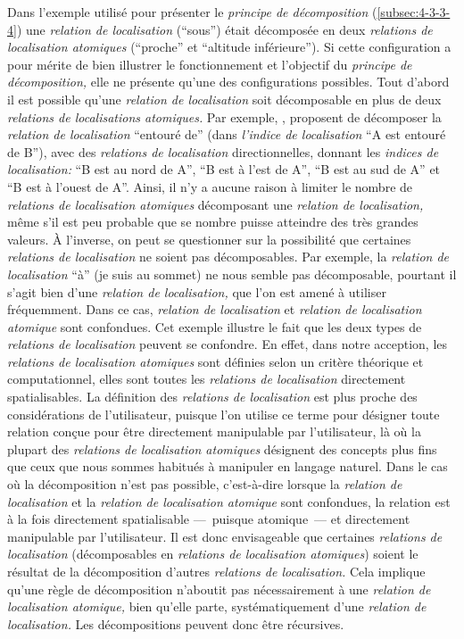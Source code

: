 Dans l'exemple utilisé pour présenter le \emph{principe de
  décomposition} (\autoref{subsec:4-3-3-4}) une \emph{relation de
  localisation} (\enquote{sous}) était décomposée en deux
\emph{relations de localisation atomiques} (\enquote{proche} et
\enquote{altitude inférieure}). Si cette configuration a pour mérite
de bien illustrer le fonctionnement et l'objectif du \emph{principe de
  décomposition,} elle ne présente qu'une des configurations
possibles. Tout d'abord il est possible qu'une \emph{relation de
  localisation} soit décomposable en plus de deux \emph{relations de
  localisations atomiques.} Par exemple, \textcite{Vanegas2011},
proposent de décomposer la \emph{relation de localisation}
\enquote{entouré de} (dans \emph{l'indice de localisation} \enquote{A
  est entouré de B}), avec des \emph{relations de localisation}
directionnelles, donnant les \emph{indices de localisation:}
\enquote{B est au nord de A}, \enquote{B est à l'est de A}, \enquote{B
  est au sud de A} et \enquote{B est à l'ouest de A}. Ainsi, il n'y a
aucune raison à limiter le nombre de \emph{relations de localisation
  atomiques} décomposant une \emph{relation de localisation,} même
s'il est peu probable que se nombre puisse atteindre des très grandes
valeurs. À l'inverse, on peut se questionner sur la possibilité que
certaines \emph{relations de localisation} ne soient pas
décomposables. Par exemple, la \emph{relation de localisation}
\enquote{à} (\eg je suis au sommet) ne nous semble pas décomposable,
pourtant il s'agit bien d'une \emph{relation de localisation,} que
l'on est amené à utiliser fréquemment. Dans ce cas, \emph{relation de
  localisation} et \emph{relation de localisation atomique} sont
confondues. Cet exemple illustre le fait que les deux types de
\emph{relations de localisation} peuvent se confondre. En effet, dans
notre acception, les \emph{relations de localisation atomiques} sont
définies selon un critère théorique et computationnel, elles sont
toutes les \emph{relations de localisation} directement
spatialisables. La définition des \emph{relations de localisation} est
plus proche des considérations de l'utilisateur, puisque l'on utilise
ce terme pour désigner toute relation conçue pour être directement
manipulable par l'utilisateur, là où la plupart des \emph{relations de
  localisation atomiques} désignent des concepts plus fins que ceux
que nous sommes habitués à manipuler en langage naturel. Dans le cas
où la décomposition n'est pas possible, c'est-à-dire lorsque la
\emph{relation de localisation} et la \emph{relation de localisation
  atomique} sont confondues, la relation est à la fois directement
spatialisable ---~puisque atomique~--- et directement manipulable par
l'utilisateur. Il est donc envisageable que certaines \emph{relations
  de localisation} (décomposables en \emph{relations de localisation
  atomiques}) soient le résultat de la décomposition d'autres
\emph{relations de localisation.} Cela implique qu'une règle de
décomposition n’aboutit pas nécessairement à une \emph{relation de
  localisation atomique,} bien qu'elle parte, systématiquement d'une
\emph{relation de localisation.} Les décompositions peuvent donc être
récursives.

